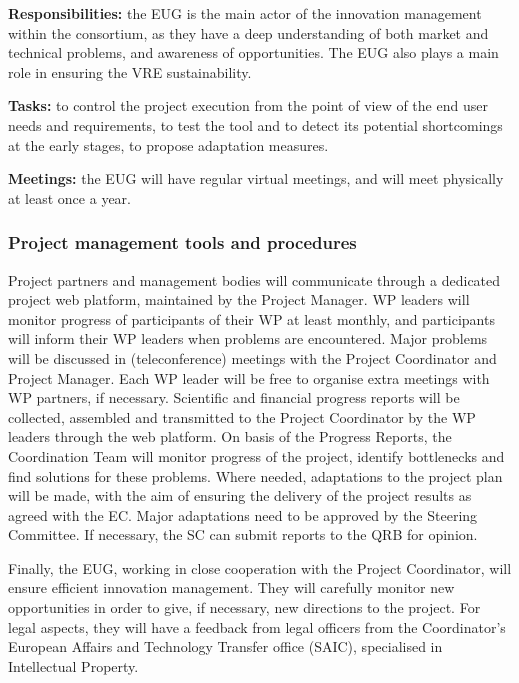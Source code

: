 \begin{description}
\textbf{Responsibilities:} the EUG is the main actor of the innovation
management within the consortium, as they have a deep understanding of
both market and technical problems, and awareness of
opportunities. The EUG also plays a main role in ensuring the VRE
sustainability.  

\textbf{Tasks:} to control the project execution from the
point of view of the end user needs and requirements, to test the tool
and to detect its potential shortcomings at the early stages, to
propose adaptation measures.  

\textbf{Meetings:} the EUG will have regular
virtual meetings, and will meet physically at least once a year.


\end{description}

\subsubsection{Project management tools and procedures}

Project partners and management bodies will communicate through
a dedicated project web platform, maintained by the Project
Manager. WP leaders will monitor progress of
participants of their WP at least monthly, and participants will inform their WP
leaders when problems are encountered. Major problems will be
discussed in (teleconference) meetings with the Project Coordinator
and Project Manager. Each WP leader will be free to organise
extra meetings with WP partners, if necessary. Scientific and
financial progress reports will be collected, assembled and
transmitted to the Project Coordinator by the WP leaders through the
web platform. On basis of the Progress Reports, the Coordination Team
will monitor progress of the project, identify bottlenecks and find
solutions for these problems. Where needed, adaptations to the project
plan will be made, with the aim of ensuring the delivery of the project
results as agreed with the EC. Major adaptations need to be approved
by the Steering Committee.  If necessary, the SC can submit reports to
the QRB for opinion.

Finally, the EUG, working in close cooperation with the
Project Coordinator, will ensure efficient innovation
management. They will carefully monitor new opportunities in
order to give, if necessary, new directions to the project. For
legal aspects, they will have a feedback from legal officers from the
Coordinator’s European Affairs and Technology Transfer office (SAIC),
specialised in Intellectual Property.

